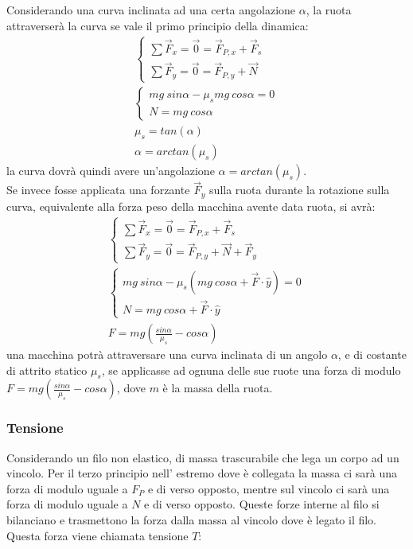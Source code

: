 \documentclass{article}
\numberwithin{equation}{subsection}
\begin{document}
Considerando una curva inclinata ad una certa angolazione $\alpha$, la ruota attraverserà la curva se vale il primo principio della dinamica:
\begin{gather}
    \begin{cases}
        \sum\vec{F}_x=\vec{0}=\vec{F}_{P,x}+\vec{F}_s\\
        \sum\vec{F}_y=\vec{0}=\vec{F}_{P,y}+\vec{N}
    \end{cases}\\
    \begin{cases}
        mg\:sin\alpha-\mu_smg\:cos\alpha=0\\
        N=mg\:cos\alpha
    \end{cases}\\
    \mu_s=tan(\alpha)\\
    \alpha=arctan(\mu_s)
\end{gather}
la curva dovrà quindi avere un'angolazione $\alpha=arctan(\mu_s)$. \\
Se invece fosse applicata una forzante $\vec{F}_y$ sulla ruota durante la rotazione sulla curva, equivalente alla forza peso della macchina avente data ruota, si avrà:
\begin{gather}
    \begin{cases}
        \sum\vec{F}_x=\vec{0}=\vec{F}_{P,x}+\vec{F}_s\\
        \sum\vec{F}_y=\vec{0}=\vec{F}_{P,y}+\vec{N}+\vec{F}_y
    \end{cases}\\
    \begin{cases}
        mg\:sin\alpha-\mu_s(mg\:cos\alpha+\vec{F}\cdot\hat{y})=0\\
        N=mg\:cos\alpha+\vec{F}\cdot\hat{y}
    \end{cases}\\
    F=mg\left(\displaystyle\frac{sin\alpha}{\mu_s}-cos\alpha\right)
\end{gather}
una macchina potrà attraversare una curva inclinata di un angolo $\alpha$, e di costante di attrito statico $\mu_s$, se applicasse ad ognuna delle sue ruote una 
forza di modulo $F=mg\left(\displaystyle\frac{sin\alpha}{\mu_s}-cos\alpha\right)$, dove $m$ è la massa della ruota.

\subsubsection{Tensione}
Considerando un filo non elastico, di massa trascurabile che 
lega un corpo ad un vincolo. Per il terzo principio nell'
estremo dove è collegata la massa ci sarà una forza di modulo 
uguale a $F_P$ e di verso opposto, mentre sul vincolo ci sarà 
una forza di modulo uguale a $N$ e di verso opposto. Queste 
forze interne al filo si bilanciano e trasmettono la forza 
dalla massa al vincolo dove è legato il filo.\\
Questa forza viene chiamata tensione $T$:
\end{document}
